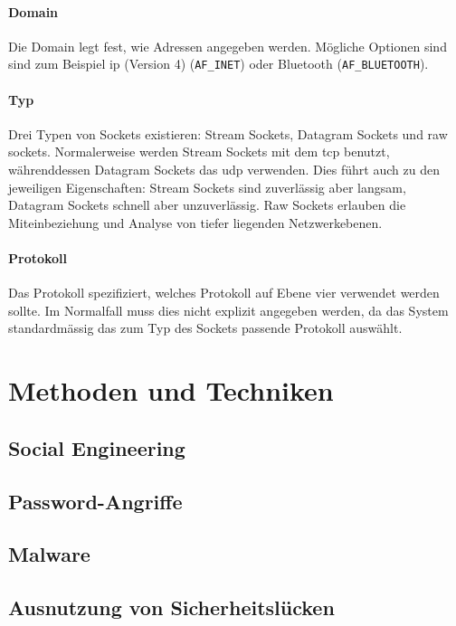\documentclass[11pt, a4paper]{article}
\begin{document}
\paragraph{Domain}
Die Domain legt fest, wie Adressen angegeben werden. Mögliche Optionen sind sind zum Beispiel \gls{ip} (Version 4) (\texttt{AF\_INET}) oder Bluetooth (\texttt{AF\_BLUETOOTH}).
\paragraph{Typ}
Drei Typen von Sockets existieren: Stream Sockets, Datagram Sockets und raw sockets. Normalerweise werden Stream Sockets mit dem \gls{tcp} benutzt, währenddessen Datagram Sockets das \gls{udp} verwenden. Dies führt auch zu den jeweiligen Eigenschaften: Stream Sockets sind zuverlässig aber langsam, Datagram Sockets schnell aber unzuverlässig. Raw Sockets erlauben die Miteinbeziehung und Analyse von tiefer liegenden Netzwerkebenen. 
\paragraph{Protokoll}
Das Protokoll spezifiziert, welches Protokoll auf Ebene vier verwendet werden sollte. Im Normalfall muss dies nicht explizit angegeben werden, da das System standardmässig das zum Typ des Sockets passende Protokoll auswählt.



\section{Methoden und Techniken}\label{sec:methoden-und-techniken}

\subsection{Social Engineering}

\subsection{Password-Angriffe}

\subsection{Malware}


\subsection{Ausnutzung von Sicherheitslücken}
\end{document}
